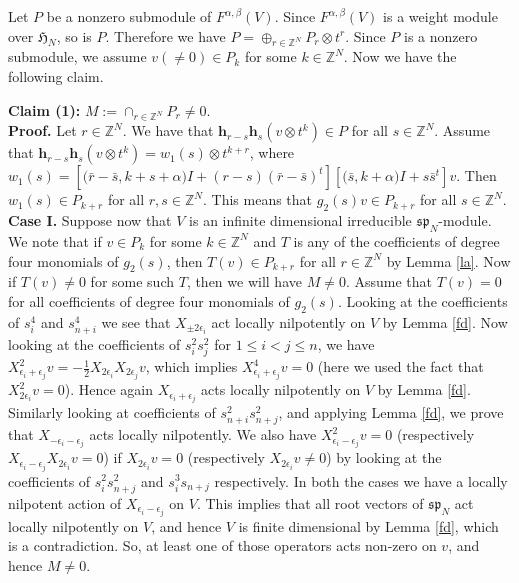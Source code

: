 \documentclass[a4paper,11pt]{amsart}
\numberwithin{equation}{section}
\theoremstyle{plain}
\newcommand{\Z}{\mathbb{Z}}
\newcommand{\s}{\mathfrak{sp}_{N}}
\newcommand{\Ha}{\mathfrak{H}_{N}}
\renewcommand{\H}{\mathbf{h}}
\begin{document}
 Let $P$ be a nonzero submodule of $F^{\alpha,\beta}(V)$. Since $F^{\alpha,\beta}(V)$ is a weight module over $\Ha$, so is $P$. Therefore we have $P=\oplus_{r\in \Z^N}P_r\otimes t^r$. Since $P$ is a nonzero submodule, we assume $v(\neq 0)\in P_k$ for some $k\in \Z^N$. Now we have the following claim.

 \medskip

 {\bf Claim (1):} $M:=\cap_{r\in \Z^N}P_r\neq 0$.\\
 
 {\bf Proof.} Let $r\in \Z^N$. We have that $\H_{r-s}\H_s(v\otimes t^k)\in P$ for all $s\in \Z^N$.
Assume that $\H_{r-s}\H_s(v\otimes t^k)=w_1(s)\otimes t^{k+r}$, where $w_1(s)=[\bm{(}\bar{r}-\bar{s},k+s+\alpha\bm{)}I+(r-s)(\bar{r}-\bar{s})^t][\bm{(}\bar{s},k+\alpha\bm{)}I+s\bar{s}^t]v$. Then $w_1(s)\in P_{k+r}$ for all $r,s\in \Z^N$. This means that $g_2(s)v\in P_{k+r}$ for all $s\in \Z^N$. \\


{\bf Case I.} Suppose now that $V$ is an infinite dimensional irreducible $\s$-module.  We note that if $v\in P_k$  for some $k\in \Z^N$ and $T$ is any of the  coefficients of degree four monomials of $g_2(s)$, then $T(v)\in P_{k+r}$ for all $r\in \Z^N$ by Lemma \ref{la}. Now if $T(v)\neq 0$ for some such $T$, then we will have $M\neq 0$. Assume that $T(v)=0$ for all coefficients of degree four monomials of $g_2(s)$. Looking at the coefficients of $s_i^4$ and $s_{n+i}^4$ we see that $X_{\pm 2\epsilon_i}$ act locally nilpotently on $V$ by Lemma \ref{fd}. Now looking at the coefficients of $s_i^2s_j^2$ for $1\leq i<j\leq n$, we have $X_{\epsilon_i+\epsilon_j}^2v=-\frac{1}{2}X_{2\epsilon_i}X_{2\epsilon_j}v$, which implies $X_{\epsilon_i+\epsilon_j}^4 v=0$ (here we used the fact that $X_{2\epsilon_i}^2 v=0$). Hence again $X_{\epsilon_i+\epsilon_j}$ acts locally nilpotently on $V$ by Lemma \ref{fd}. Similarly looking at coefficients of $s_{n+i}^2s_{n+j}^2$, and applying Lemma \ref{fd}, we prove that $X_{-\epsilon_i-\epsilon_j}$ acts locally nilpotently. We also have  $X_{\epsilon_i-\epsilon_j}^2 v=0$ (respectively $X_{\epsilon_i-\epsilon_j}X_{2\epsilon_i} v=0$) if $X_{2\epsilon_i}v=0$ (respectively $X_{2\epsilon_i}v\neq 0$) by looking at the coefficients of $s_i^2s_{n+j}^2$ and $s_i^3s_{n+j}$ respectively. In both the cases we  have a locally nilpotent action of $X_{\epsilon_i-\epsilon_j}$ on $V$. This implies that all root vectors of $\s$ act locally nilpotently on $V$, and hence  $V$ is finite dimensional by Lemma \ref{fd}, which is a contradiction. So, at least one of those operators acts non-zero on $v$, and hence $M\neq 0$. \\
\end{document}
